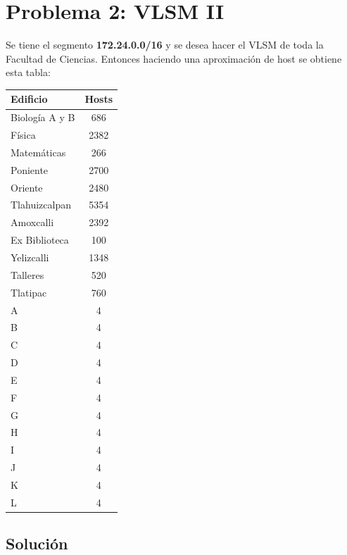 \section{Problema 2: VLSM II}

\begin{tcolorbox}[enunciado]
Se tiene el segmento \textbf{172.24.0.0/16} y se desea hacer el VLSM de toda la Facultad de Ciencias. Entonces haciendo una aproximación de host se obtiene esta tabla:

\begin{center}
    \begin{tabular}{lc}
    \toprule
    \textbf{Edificio} & \textbf{Hosts} \\
    \midrule
    Biología A y B & 686 \\
    Física & 2382 \\
    Matemáticas & 266 \\
    Poniente & 2700 \\
    Oriente & 2480 \\
    Tlahuizcalpan & 5354 \\
    Amoxcalli & 2392 \\
    Ex Biblioteca & 100 \\
    Yelizcalli & 1348 \\
    Talleres & 520 \\
    Tlatipac & 760 \\
    A & 4 \\
    B & 4 \\
    C & 4 \\
    D & 4 \\
    E & 4 \\
    F & 4 \\
    G & 4 \\
    H & 4 \\
    I & 4 \\
    J & 4 \\
    K & 4 \\
    L & 4 \\
    \bottomrule
    \end{tabular}
\end{center}
\end{tcolorbox}

\subsection*{Solución}
